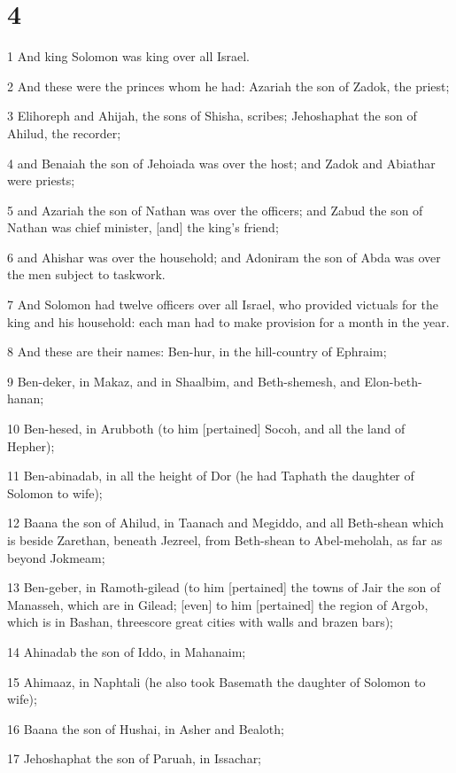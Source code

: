 \chapter{4}

\par 1 And king Solomon was king over all Israel.
\par 2 And these were the princes whom he had: Azariah the son of Zadok, the priest;
\par 3 Elihoreph and Ahijah, the sons of Shisha, scribes; Jehoshaphat the son of Ahilud, the recorder;
\par 4 and Benaiah the son of Jehoiada was over the host; and Zadok and Abiathar were priests;
\par 5 and Azariah the son of Nathan was over the officers; and Zabud the son of Nathan was chief minister, [and] the king's friend;
\par 6 and Ahishar was over the household; and Adoniram the son of Abda was over the men subject to taskwork.
\par 7 And Solomon had twelve officers over all Israel, who provided victuals for the king and his household: each man had to make provision for a month in the year.
\par 8 And these are their names: Ben-hur, in the hill-country of Ephraim;
\par 9 Ben-deker, in Makaz, and in Shaalbim, and Beth-shemesh, and Elon-beth-hanan;
\par 10 Ben-hesed, in Arubboth (to him [pertained] Socoh, and all the land of Hepher);
\par 11 Ben-abinadab, in all the height of Dor (he had Taphath the daughter of Solomon to wife);
\par 12 Baana the son of Ahilud, in Taanach and Megiddo, and all Beth-shean which is beside Zarethan, beneath Jezreel, from Beth-shean to Abel-meholah, as far as beyond Jokmeam;
\par 13 Ben-geber, in Ramoth-gilead (to him [pertained] the towns of Jair the son of Manasseh, which are in Gilead; [even] to him [pertained] the region of Argob, which is in Bashan, threescore great cities with walls and brazen bars);
\par 14 Ahinadab the son of Iddo, in Mahanaim;
\par 15 Ahimaaz, in Naphtali (he also took Basemath the daughter of Solomon to wife);
\par 16 Baana the son of Hushai, in Asher and Bealoth;
\par 17 Jehoshaphat the son of Paruah, in Issachar;
